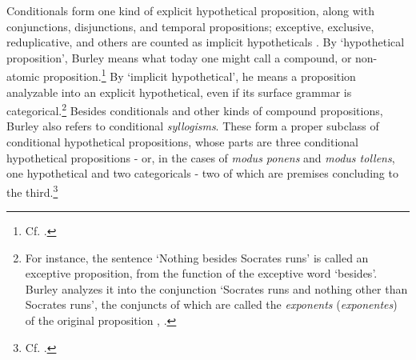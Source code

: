 \documentclass[]{article}
\begin{document}
Conditionals form one kind of explicit hypothetical proposition, along with conjunctions, disjunctions, and temporal propositions; exceptive, exclusive, reduplicative, and others are counted as implicit hypotheticals \cite[pp. 106-107]{BurleyDPAL}. By `hypothetical proposition', Burley means what today one might call a compound, or non-atomic proposition.\footnote{Cf. \cite[p. 66]{Buridan2015}.} By `implicit hypothetical', he means a proposition analyzable into an explicit hypothetical, even if its surface grammar is categorical.\footnote{For instance, the sentence `Nothing besides Socrates runs' is called an exceptive proposition, from the function of the exceptive word `besides'. Burley analyzes it into the conjunction `Socrates runs and nothing other than Socrates runs', the conjuncts of which are called the \textit{exponents} (\textit{exponentes}) of the original proposition \cite[p. 121, par. 44]{Green-Pedersen1980b}, \cite[pp. 164-165]{BurleyDPAL}.} Besides conditionals and other kinds of compound propositions, Burley also refers to conditional \textit{syllogisms}. These form a proper subclass of conditional hypothetical propositions, whose parts are three conditional hypothetical propositions - or, in the cases of \textit{modus ponens} and \textit{modus tollens}, one hypothetical and two categoricals - two of which are premises concluding to the third.\footnote{Cf. \cite[5.1.3, pp. 308-309]{BuridanKlimaSD} \cite{Klima2004b}.}
\end{document}

